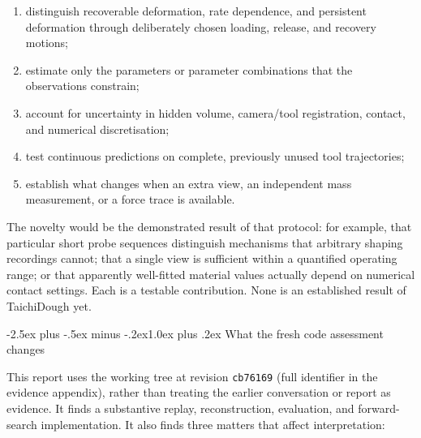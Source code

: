 \documentclass[
  11pt,
]{article}
\makeatletter
\providecommand{\tightlist}{%
  \setlength{\itemsep}{0pt}\setlength{\parskip}{0pt}}
\renewcommand\subsection{\needspace{5\baselineskip}\@startsection{subsection}{2}{\z@}%
  {-2.5ex plus -.5ex minus -.2ex}{1.0ex plus .2ex}%
  {\normalfont\sffamily\large\bfseries\color{accent}}}
\makeatother
\begin{document}
\begin{enumerate}
\def\labelenumi{\arabic{enumi}.}
\tightlist
\item
  distinguish recoverable deformation, rate dependence, and persistent
  deformation through deliberately chosen loading, release, and recovery
  motions;
\item
  estimate only the parameters or parameter combinations that the
  observations constrain;
\item
  account for uncertainty in hidden volume, camera/tool registration,
  contact, and numerical discretisation;
\item
  test continuous predictions on complete, previously unused tool
  trajectories;
\item
  establish what changes when an extra view, an independent mass
  measurement, or a force trace is available.
\end{enumerate}

The novelty would be the demonstrated result of that protocol: for
example, that particular short probe sequences distinguish mechanisms
that arbitrary shaping recordings cannot; that a single view is
sufficient within a quantified operating range; or that apparently
well-fitted material values actually depend on numerical contact
settings. Each is a testable contribution. None is an established result
of TaichiDough yet.

\subsection{What the fresh code assessment
changes}\label{what-the-fresh-code-assessment-changes}

This report uses the working tree at revision \texttt{cb76169} (full
identifier in the evidence appendix), rather than treating the earlier
conversation or report as evidence. It finds a substantive replay,
reconstruction, evaluation, and forward-search implementation. It also
finds three matters that affect interpretation:
\end{document}
